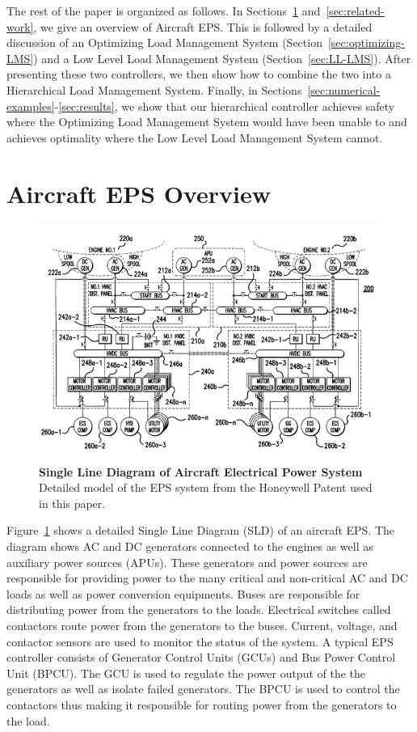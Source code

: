 \documentclass{acm_proc_article-sp}
\begin{document}
The rest of the paper is organized as follows.
In Sections~\ref{sec:overview} and~\ref{sec:related-work}, we give an overview of Aircraft EPS. %
This is followed by a detailed discussion of an Optimizing Load Management System (Section~\ref{sec:optimizing-LMS}) and a Low Level Load Management System (Section~\ref{sec:LL-LMS}). 
After presenting these two controllers, we then show how to combine the two into a Hierarchical Load Management System. 
Finally, in Sections~\ref{sec:numerical-examples}-\ref{sec:results}, we show that our hierarchical controller achieves safety where the Optimizing Load Management System would have been unable to and achieves optimality where the Low Level Load Management System cannot.

\section{Aircraft EPS Overview}
\label{sec:overview}
\begin{figure}[htb]
  \centering
  \includegraphics[width=\columnwidth]{figures/eps.png}
  \caption{\textbf{Single Line Diagram of Aircraft Electrical Power System} Detailed model of the EPS system from the Honeywell Patent used
  in this paper.}
  \label{fig:sld}
\end{figure}
Figure~\ref{fig:sld} shows a detailed Single Line Diagram (SLD) of an aircraft EPS. The diagram shows AC and DC generators connected to the engines
as well as auxiliary power sources (APUs). These generators and power sources are responsible for providing power to the many critical and non-critical
AC and DC loads as well as power conversion equipments. Buses are responsible for distributing power from the generators to the loads. Electrical switches
called contactors route power from the generators to the buses. Current, voltage, and contactor sensors are used to monitor the status of the system. A
typical EPS controller consists of Generator Control Units (GCUs) and Bus Power Control Unit (BPCU). The GCU is used to regulate the power output of the
the generators as well as isolate failed generators. The BPCU is used to control the contactors thus making it responsible for routing power from the
generators to the load.
\end{document}
